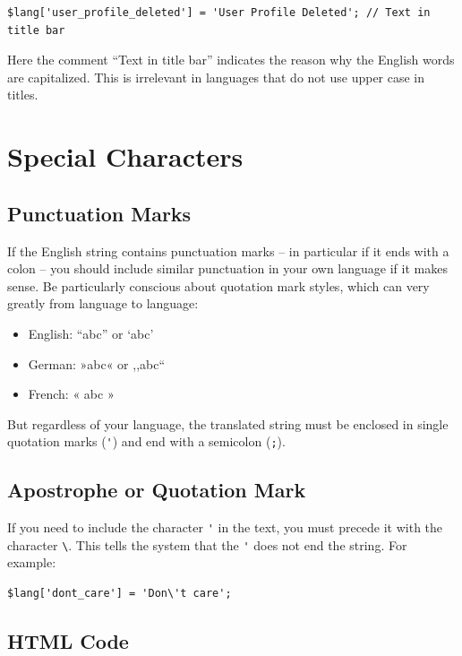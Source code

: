 \documentclass[11pt,oneside,a4paper]{memoir}
\begin{document}
\begin{lstlisting}
$lang['user_profile_deleted'] = 'User Profile Deleted'; // Text in title bar
\end{lstlisting}

Here the comment ``Text in title bar'' indicates the reason why the English words are capitalized.
This is irrelevant in languages that do not use upper case in titles.

\section{Special Characters}

\subsection{Punctuation Marks}

If the English string contains punctuation marks -- in particular if it ends with a colon -- you should
include similar punctuation in your own language if it makes sense. Be particularly conscious about
quotation mark styles, which can very greatly from language to language:

\begin{itemize}
\item[] English: ``abc'' or `abc'
\item[] German: »abc« or ,,abc``
\item[] French: « abc »
\end{itemize}

But regardless of your language, the translated string must be enclosed in single quotation marks (\verb|'|) and end
with a semicolon (\verb|;|).


\subsection{Apostrophe or Quotation Mark}

If you need to include the character \verb|'| in the text, you must precede it with the character
\verb|\|. This tells the system that the \verb|'| does not end the string. For example:


\begin{lstlisting}
$lang['dont_care'] = 'Don\'t care';
\end{lstlisting}

\subsection{HTML Code}
\end{document}
